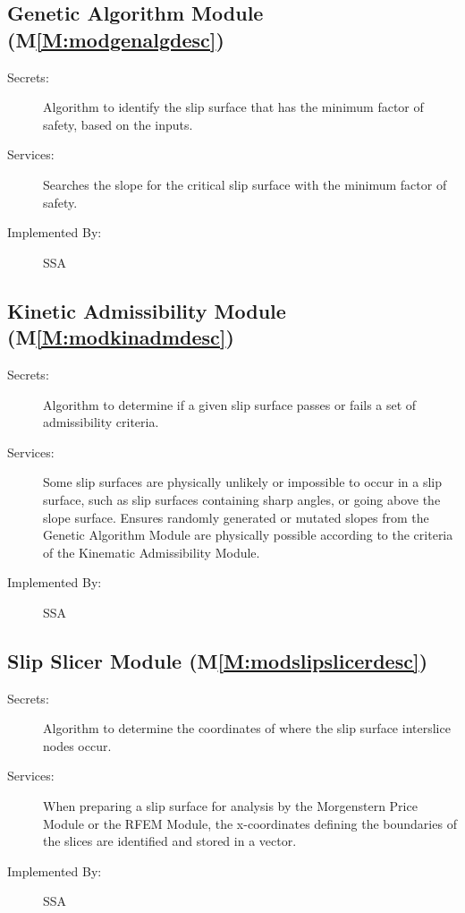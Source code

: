 \documentclass[12pt]{article}
\begin{document}
\subsection{Genetic Algorithm Module (M\ref{M:modgenalgdesc})}
\label{Sec:GeneAlgoModu()}
\begin{description}
\item[Secrets:]Algorithm to identify the slip surface that has the minimum factor of safety, based on the inputs.
\item[Services:]Searches the slope for the critical slip surface with the minimum factor of safety.
\item[Implemented By:]SSA
\end{description}
\subsection{Kinetic Admissibility Module (M\ref{M:modkinadmdesc})}
\label{Sec:KineAdmiModu()}
\begin{description}
\item[Secrets:]Algorithm to determine if a given slip surface passes or fails a set of admissibility criteria.
\item[Services:]Some slip surfaces are physically unlikely or impossible to occur in a slip surface, such as slip surfaces containing sharp angles, or going above the slope surface. Ensures randomly generated or mutated slopes from the Genetic Algorithm Module are physically possible according to the criteria of the Kinematic Admissibility Module.
\item[Implemented By:]SSA
\end{description}
\subsection{Slip Slicer Module (M\ref{M:modslipslicerdesc})}
\label{Sec:SlipSlicModu()}
\begin{description}
\item[Secrets:]Algorithm to determine the coordinates of where the slip surface interslice nodes occur.
\item[Services:]When preparing a slip surface for analysis by the Morgenstern Price Module or the RFEM Module, the x-coordinates defining the boundaries of the slices are identified and stored in a vector.
\item[Implemented By:]SSA
\end{description}
\end{document}
